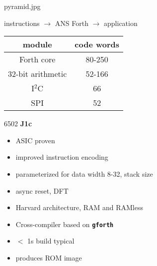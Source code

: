 \documentclass[compress,mathserif]{beamer}
\newcommand{\mach}[1]{\texttt{\textbf{#1}}}
\newcommand{\itwoc}{I$^{\text{2}}$C }
\begin{document}
% 
% 

\begin{imageframe}{pyramid.jpg}
\centerline{
  {instructions $\rightarrow$ ANS Forth $\rightarrow$ application}
  }
\end{imageframe}

\begin{frame}
\vskip1cm
\footnotesize
\begin{center}
\begin{tabular}{cc}
module & code words \\
\hline
Forth core & 80-250 \\
32-bit arithmetic & 52-166 \\
\itwoc & 66 \\
SPI & 52 \\
\end{tabular}
\end{center}
\end{frame}

\begin{imageframe}{6502}
  {\bf\Huge J1c}
\end{imageframe}

\begin{frame}
\begin{itemize}
   \item ASIC proven
   \item improved instruction encoding
   \item parameterized for data width 8-32, stack size
   \item async reset, DFT
   \item Harvard architecture, RAM and RAMless
\end{itemize}
\end{frame}

\begin{frame}
\begin{itemize}
   \item Cross-compiler based on \mach{gforth}
   \item $<$ 1s build typical
   \item produces ROM image
\end{itemize}
\end{frame}
\end{document}
